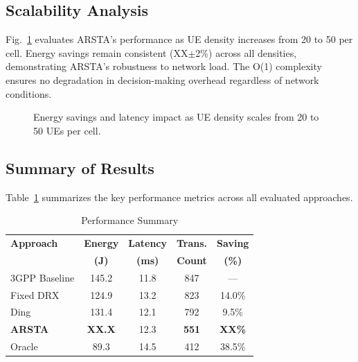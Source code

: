 \documentclass[conference]{IEEEtran}
\begin{document}
\subsection{Scalability Analysis}
\label{subsec:scalability}

Fig.~\ref{fig:scalability} evaluates ARSTA's performance as UE density increases from 20 to 50 per cell. Energy savings remain consistent (XX$\pm$2\%) across all densities, demonstrating ARSTA's robustness to network load. The O(1) complexity ensures no degradation in decision-making overhead regardless of network conditions.

\begin{figure}[t]
    \centering
    \caption{Energy savings and latency impact as UE density scales from 20 to 50 UEs per cell.}
    \label{fig:scalability}
\end{figure}

\subsection{Summary of Results}

Table~\ref{tab:results_summary} summarizes the key performance metrics across all evaluated approaches.

\begin{table}[t]
\centering
\caption{Performance Summary}
\label{tab:results_summary}
\begin{tabular}{@{}lcccc@{}}
\toprule
\textbf{Approach} & \textbf{Energy} & \textbf{Latency} & \textbf{Trans.} & \textbf{Saving} \\
 & \textbf{(J)} & \textbf{(ms)} & \textbf{Count} & \textbf{(\%)} \\
\midrule
3GPP Baseline & 145.2 & 11.8 & 847 & --- \\
Fixed DRX & 124.9 & 13.2 & 823 & 14.0\% \\
Ding~\cite{Ding2024} & 131.4 & 12.1 & 792 & 9.5\% \\
\textbf{ARSTA} & \textbf{XX.X} & 12.3 & \textbf{551} & \textbf{XX\%} \\
Oracle & 89.3 & 14.5 & 412 & 38.5\% \\
\bottomrule
\end{tabular}
\end{table}
\end{document}
